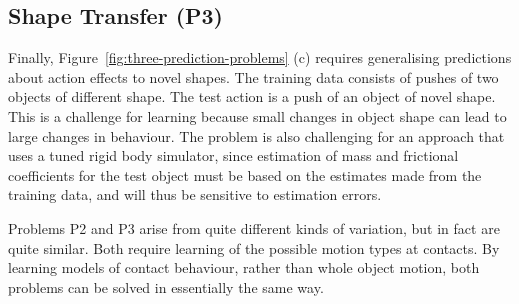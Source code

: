 \subsection{Shape Transfer (P3)} Finally, Figure~\ref{fig:three-prediction-problems} (c) requires generalising predictions about action effects to novel shapes. The training data consists of pushes of two objects of different shape. The test action is a push of an object of novel shape. This is a challenge for learning because small changes in object shape can lead to large changes in behaviour. The problem is also challenging for an approach that uses a tuned rigid body simulator, since estimation of mass and frictional coefficients for the test object must be based on the estimates made from the training data, and will thus be sensitive to estimation errors.

Problems P2 and P3 arise from quite different kinds of variation, but in fact are quite similar. Both require learning of the possible motion types at contacts. By learning models of contact behaviour, rather than whole object motion, both problems can be solved in essentially the same way.

